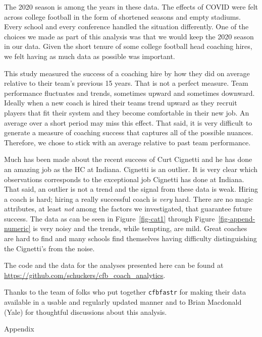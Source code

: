 \documentclass[
  12pt]{article}
\begin{document}
The 2020 season is among the years in these data. The effects of COVID
were felt across college football in the form of shortened seasons and
empty stadiums. Every school and every conference handled the situation
differently. One of the choices we made as part of this analysis was
that we would keep the 2020 season in our data. Given the short tenure
of some college football head coaching hires, we felt having as much
data as possible was important.

This study measured the success of a coaching hire by how they did on
average relative to their team's previous 15 years. That is not a
perfect measure. Team performance fluctuates and trends, sometimes
upward and sometimes downward. Ideally when a new coach is hired their
teams trend upward as they recruit players that fit their system and
they become comfortable in their new job. An average over a short period
may miss this effect. That said, it is very difficult to generate a
measure of coaching success that captures all of the possible nuances.
Therefore, we chose to stick with an average relative to past team
performance.

Much has been made about the recent success of Curt Cignetti and he has
done an amazing job as the HC at Indiana. Cignetti is an outlier. It is
very clear which observations corresponds to the exceptional job
Cignetti has done at Indiana. That said, an outlier is not a trend and
the signal from these data is weak. Hiring a coach is hard; hiring a
really successful coach is \emph{very} hard. There are no magic
attributes, at least \emph{not} among the factors we investigated, that
guarantee future success. The data as can be seen in
Figure~\ref{fig-cat1} through Figure~\ref{fig-append-numeric} is very
noisy and the trends, while tempting, are mild. Great coaches are hard
to find and many schools find themselves having difficulty
distinguishing the Cignetti's from the noise.

The code and the data for the analyses presented here can be found at
\url{https://github.com/schuckers/cfb_coach_analytics}.

Thanks to the team of folks who put together \texttt{cfbfastr} for
making their data available in a usable and regularly updated manner and
to Brian Macdonald (Yale) for thoughtful discussions about this
analysis.

Appendix
\end{document}
